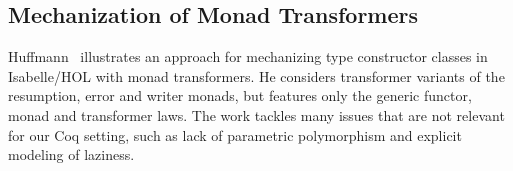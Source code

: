 \subsection{Mechanization of Monad Transformers}
Huffmann~\cite{huffmann:transformers} illustrates an approach for mechanizing
type constructor classes in Isabelle/HOL with monad transformers.  He considers
transformer variants of the resumption, error and writer monads, but features
only the generic functor, monad and transformer laws. The work tackles many
issues that are not relevant for our Coq setting, such as lack of parametric
polymorphism and explicit modeling of laziness.

